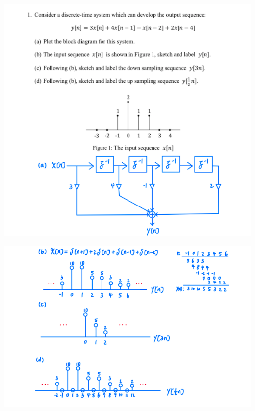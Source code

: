 \documentclass[a4paper]{article}
\begin{document}

	
	\begin{center}
		\includegraphics[width=1.0\linewidth]{screenshot001}
	\end{center}
	\begin{center}
		\includegraphics[width=1\linewidth]{screenshot002}
	\end{center}
\end{document}
